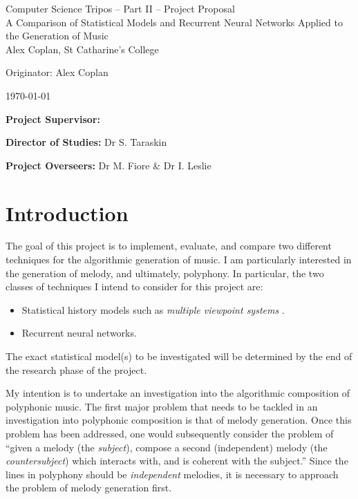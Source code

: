 \documentclass[12pt,a4paper,twoside]{article}
\begin{document}
\cleanlookdateon

\begin{center}
\Large
Computer Science Tripos -- Part II -- Project Proposal\\[4mm]
\LARGE
A Comparison of Statistical Models and Recurrent Neural Networks Applied to the
Generation of Music\\[4mm]

\large
Alex Coplan, St Catharine's College

Originator: Alex Coplan

\today
\end{center}

\vspace{5mm}

\textbf{Project Supervisor:} 

\textbf{Director of Studies:} Dr S. Taraskin

\textbf{Project Overseers:} Dr M. Fiore \& Dr I. Leslie


\section*{Introduction}

The goal of this project is to implement, evaluate, and compare two different
techniques for the algorithmic generation of music. I am particularly interested
in the generation of melody, and ultimately, polyphony. In particular, the two
classes of techniques I intend to consider for this project are:
\begin{itemize}[itemsep=0mm]
	\item Statistical history models such as \emph{multiple viewpoint
			systems} \cite{conklin1995viewpoints}.
	\item Recurrent neural networks.
\end{itemize}

The exact statistical model(s) to be investigated will be determined by the end
of the research phase of the project.

My intention is to undertake an investigation into the algorithmic composition
of polyphonic music. The first major problem that needs to be tackled in an
investigation into polyphonic composition is that of melody generation. Once
this problem has been addressed, one would subsequently consider the problem of
``given a melody (the \emph{subject}), compose a second (independent) melody
(the \emph{countersubject}) which interacts with, and is coherent with the
subject.'' Since the lines in polyphony should be \emph{independent} melodies,
it is necessary to approach the problem of melody generation first.
\end{document}

